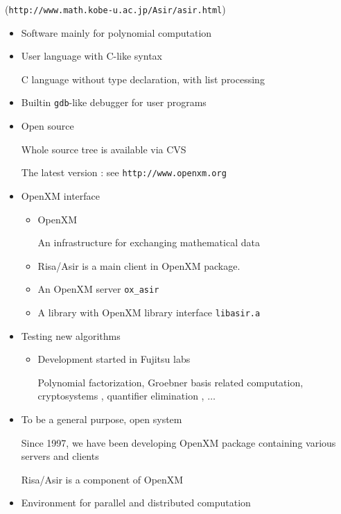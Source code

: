 \begin{slide}{}

({\tt http://www.math.kobe-u.ac.jp/Asir/asir.html})

\begin{itemize}
\item Software mainly for polynomial computation

\item User language with C-like syntax

C language without type declaration, with list processing

\item Builtin {\tt gdb}-like debugger for user programs

\item Open source

Whole source tree is available via CVS

The latest version : see {\tt http://www.openxm.org}

\item OpenXM interface

\begin{itemize}
\item OpenXM 

An infrastructure for exchanging mathematical data
\item Risa/Asir is a main client in OpenXM package.
\item An OpenXM server {\tt ox\_asir}
\item A library with OpenXM library interface {\tt libasir.a}
\end{itemize}
\end{itemize}
\end{slide}

\begin{slide}{}

\begin{itemize}
\item Testing new algorithms

\begin{itemize}
\item Development started in Fujitsu labs

Polynomial factorization, Groebner basis related computation,
cryptosystems , quantifier elimination , $\ldots$
\end{itemize}

\item To be a general purpose, open system

Since 1997, we have been developing OpenXM package
containing various servers and clients

Risa/Asir is a component of OpenXM

\item Environment for parallel and distributed computation

\end{itemize}
\end{slide}

